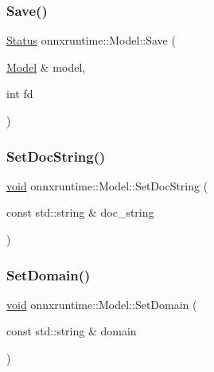 \subsubsection{\texorpdfstring{Save()}{Save()}\hspace{0.1cm}{\footnotesize\ttfamily [2/2]}}
{\footnotesize\ttfamily \mbox{\hyperlink{classonnxruntime_1_1common_1_1Status}{Status}} onnxruntime\+::\+Model\+::\+Save (\begin{DoxyParamCaption}\item[{\mbox{\hyperlink{classonnxruntime_1_1Model}{Model}} \&}]{model,  }\item[{int}]{fd }\end{DoxyParamCaption})\hspace{0.3cm}{\ttfamily [static]}}

\mbox{\label{classonnxruntime_1_1Model_a5a2597f28c82e677099831245dfac50b}} 
\subsubsection{\texorpdfstring{Set\+Doc\+String()}{SetDocString()}}
{\footnotesize\ttfamily \mbox{\hyperlink{mlasi_8h_a88f941d423cb2a819b70a1358982b1a6}{void}} onnxruntime\+::\+Model\+::\+Set\+Doc\+String (\begin{DoxyParamCaption}\item[{const std\+::string \&}]{doc\+\_\+string }\end{DoxyParamCaption})}

\mbox{\label{classonnxruntime_1_1Model_a95c8874dfc54e6c808c2be66e19cefd2}} 
\subsubsection{\texorpdfstring{Set\+Domain()}{SetDomain()}}
{\footnotesize\ttfamily \mbox{\hyperlink{mlasi_8h_a88f941d423cb2a819b70a1358982b1a6}{void}} onnxruntime\+::\+Model\+::\+Set\+Domain (\begin{DoxyParamCaption}\item[{const std\+::string \&}]{domain }\end{DoxyParamCaption})}

